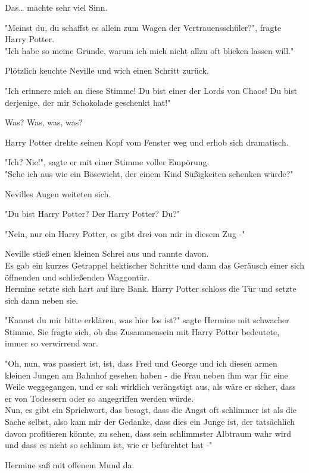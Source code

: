 {Das… machte sehr viel Sinn.

"Meinst du, du schaffst es allein zum Wagen der Vertrauensschüler?", fragte Harry Potter.\\ "Ich habe so meine Gründe, warum ich mich nicht allzu oft blicken lassen will."

Plötzlich keuchte Neville und wich einen Schritt zurück.

"Ich erinnere mich an diese Stimme! Du bist einer der Lords von Chaos! Du bist derjenige, der mir Schokolade geschenkt hat!"

Was? Was, was, was?

Harry Potter drehte seinen Kopf vom Fenster weg und erhob sich dramatisch.

"Ich? Nie!", sagte er mit einer Stimme voller Empörung.\\ "Sehe ich aus wie ein Bösewicht, der einem Kind Süßigkeiten schenken würde?"

Nevilles Augen weiteten sich.

"Du bist Harry Potter? Der Harry Potter? Du?"

"Nein, nur ein Harry Potter, es gibt drei von mir in diesem Zug -"

Neville stieß einen kleinen Schrei aus und rannte davon.\\ Es gab ein kurzes Getrappel hektischer Schritte und dann das Geräusch einer sich öffnenden und schließenden Waggontür.\\ Hermine setzte sich hart auf ihre Bank. Harry Potter schloss die Tür und setzte sich dann neben sie.

"Kannst du mir bitte erklären, was hier los ist?" sagte Hermine mit schwacher Stimme. Sie fragte sich, ob das Zusammensein mit Harry Potter bedeutete, immer so verwirrend war.

"Oh, nun, was passiert ist, ist, dass Fred und George und ich diesen armen kleinen Jungen am Bahnhof gesehen haben - die Frau neben ihm war für eine Weile weggegangen, und er sah wirklich verängstigt aus, als wäre er sicher, dass er von Todessern oder so angegriffen werden würde.\\ Nun, es gibt ein Sprichwort, das besagt, dass die Angst oft schlimmer ist als die Sache selbst, also kam mir der Gedanke, dass dies ein Junge ist, der tatsächlich davon profitieren könnte, zu sehen, dass sein schlimmster Albtraum wahr wird und dass es nicht so schlimm ist, wie er befürchtet hat -"

Hermine saß mit offenem Mund da.

}
